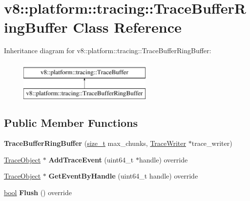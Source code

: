 \hypertarget{classv8_1_1platform_1_1tracing_1_1TraceBufferRingBuffer}{}\section{v8\+:\+:platform\+:\+:tracing\+:\+:Trace\+Buffer\+Ring\+Buffer Class Reference}
\label{classv8_1_1platform_1_1tracing_1_1TraceBufferRingBuffer}
Inheritance diagram for v8\+:\+:platform\+:\+:tracing\+:\+:Trace\+Buffer\+Ring\+Buffer\+:\begin{figure}[H]
\begin{center}
\leavevmode
\includegraphics[height=2.000000cm]{classv8_1_1platform_1_1tracing_1_1TraceBufferRingBuffer}
\end{center}
\end{figure}
\subsection*{Public Member Functions}
\begin{DoxyCompactItemize}
\item 
\mbox{\label{classv8_1_1platform_1_1tracing_1_1TraceBufferRingBuffer_a1e5c4dbe0670124e68dd8625a6e823d2}} 
{\bfseries Trace\+Buffer\+Ring\+Buffer} (\mbox{\hyperlink{classsize__t}{size\+\_\+t}} max\+\_\+chunks, \mbox{\hyperlink{classv8_1_1platform_1_1tracing_1_1TraceWriter}{Trace\+Writer}} $\ast$trace\+\_\+writer)
\item 
\mbox{\label{classv8_1_1platform_1_1tracing_1_1TraceBufferRingBuffer_abf965dcde2df5e3c0159f411ced0a03d}} 
\mbox{\hyperlink{classv8_1_1platform_1_1tracing_1_1TraceObject}{Trace\+Object}} $\ast$ {\bfseries Add\+Trace\+Event} (uint64\+\_\+t $\ast$handle) override
\item 
\mbox{\label{classv8_1_1platform_1_1tracing_1_1TraceBufferRingBuffer_a4c87a36fa8366eaeacaaf73eaf691d9b}} 
\mbox{\hyperlink{classv8_1_1platform_1_1tracing_1_1TraceObject}{Trace\+Object}} $\ast$ {\bfseries Get\+Event\+By\+Handle} (uint64\+\_\+t handle) override
\item 
\mbox{\label{classv8_1_1platform_1_1tracing_1_1TraceBufferRingBuffer_a21202d84d990c72b3e4ad212b88ce08c}} 
\mbox{\hyperlink{classbool}{bool}} {\bfseries Flush} () override
\end{DoxyCompactItemize}
